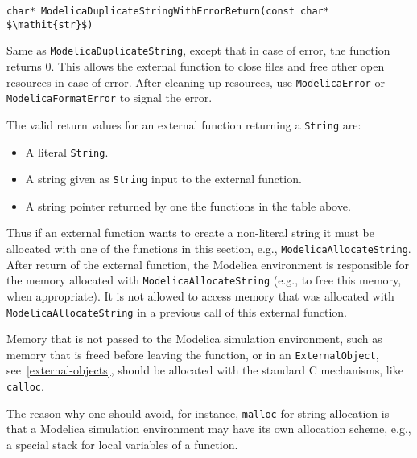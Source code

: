\begin{functiondefinition}[ModelicaDuplicateStringWithErrorReturn]
\begin{synopsis}[C]\begin{lstlisting}
char* ModelicaDuplicateStringWithErrorReturn(const char* $\mathit{str}$)
\end{lstlisting}\end{synopsis}
\begin{semantics}
Same as \lstinline[language=C]!ModelicaDuplicateString!, except that in case of error, the function returns 0.  This allows the external function to close files and free other open resources in case of error. After cleaning up resources, use \lstinline[language=C]!ModelicaError! or \lstinline[language=C]!ModelicaFormatError! to signal the error.
\end{semantics}
\end{functiondefinition}

The valid return values for an external function returning a \lstinline!String! are:
\begin{itemize}
\item A literal \lstinline!String!.
\item A string given as \lstinline!String! input to the external function.
\item A string pointer returned by one the functions in the table above.
\end{itemize}

Thus if an external function wants to create a non-literal string it must be allocated with one of the functions in this section, e.g., \lstinline[language=C]!ModelicaAllocateString!.  After return of the external function, the Modelica environment is responsible for the memory allocated with \lstinline[language=C]!ModelicaAllocateString! (e.g., to free this memory, when appropriate).  It is not allowed to access memory that was allocated with \lstinline[language=C]!ModelicaAllocateString! in a previous call of this external function.

\begin{nonnormative}
Memory that is not passed to the Modelica simulation environment, such as memory that is freed before leaving the function, or in an \lstinline!ExternalObject!,
see~\cref{external-objects}, should be allocated with the standard C mechanisms, like \lstinline[language=C]!calloc!.
\end{nonnormative}

\begin{nonnormative}
The reason why one should avoid, for instance, \lstinline[language=C]!malloc! for string allocation is that a Modelica simulation environment may have
its own allocation scheme, e.g., a special stack for local variables of a function.
\end{nonnormative}

